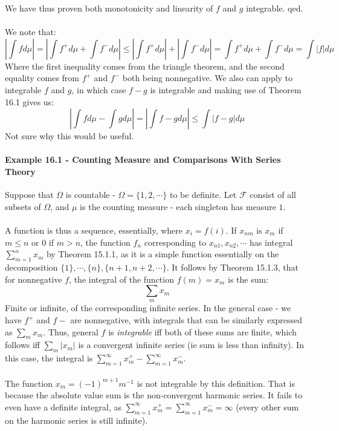 \documentclass[12pt,a4paper]{article}
\newcommand{\1}[1]{\mathbbm{1}\left\{ #1 \right\}}
\newcommand{\fcal}{\mathcal{F}}
\begin{document}
We have thus proven both monotonicity and linearity of $f$ and $g$ integrable. qed.
\\\\
We note that:
$$
	\left|\int f d\mu\right| =
	\left|\int f^+ d\mu + \int f^- d\mu\right|
	\leq
	\left|\int f^+ d\mu\right| + \left|\int f^- d\mu\right| =
	\int f^+d\mu + \int f^- d\mu =
	\int |f| d\mu
$$
Where the first inequality comes from the triangle theorem, and the second equality comes from $f^+$ and $f^-$ both being nonnegative. We also can apply to integrable $f$ and $g$, in which case $f - g$ is integrable and making use of Theorem 16.1 gives us:
$$
	\left|\int f d\mu - \int g d\mu\right| =
	\left|\int f - g d\mu\right| \leq
	\int \left|f - g\right| d\mu
$$
Not sure why this would be useful.

\paragraph{Example 16.1 - Counting Measure and Comparisons With Series Theory} Suppose that $\Omega$ is countable - $\Omega = \{1, 2, \cdots\}$ to be definite. Let $\fcal$ consist of all subsets of $\Omega$, and $\mu$ is the counting measure - each singleton has measure $1$.
\\\\
A function is thus a sequence, essentially, where $x_i = f(i)$. If $x_{nm}$ is $x_m$ if $m \leq n$ or $0$ if $m > n$, the function $f_n$ corresponding to $x_{n1}, x_{n2}, \cdots$ has integral $\sum_{m=1}^n x_m$ by Theorem 15.1.1, as it is a simple function essentially on the decomposition $\{1\}, \cdots, \{n\}, \{n+1, n+2, \cdots\}$. It follows by Theorem 15.1.3, that for nonnegative $f$, the integral of the function $f(m) = x_m$ is the sum:
$$
	\sum_m x_m
$$
Finite or infinite, of the corresponding infinite series. In the general case - we have $f^+$ and $f-$ are nonnegative, with integrals that can be similarly expressed as $\sum_m x_m$. Thus, general $f$ is \textit{integrable} iff both of these sums are finite, which follows iff $\sum_m |x_m|$ is a convergent infinite series (ie sum is less than infinity). In this case, the integral is $\sum_{m=1}^\infty x_m^+ - \sum_{m=1}^\infty x_m^-$.
\\\\
The function $x_m = (-1)^{m+1}m^{-1}$ is not integrable by this definition. That is because the absolute value sum is the non-convergent harmonic series. It fails to even have a definite integral, as $\sum_{m=1}^\infty x_m^+ = \sum_{m=1}^\infty x_m^- = \infty$ (every other sum on the harmonic series is still infinite).
\end{document}
